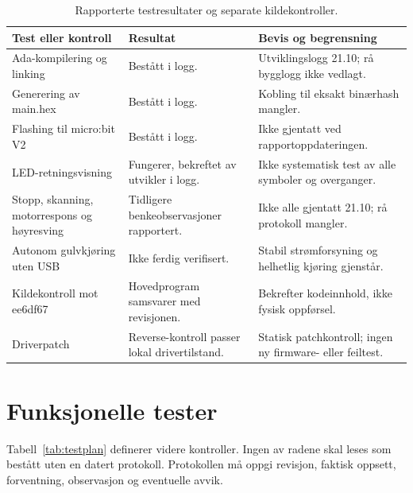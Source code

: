 \documentclass[a4paper,11pt,oneside]{report}
\begin{document}
\begin{table}[htbp]
\small
\begin{tabularx}{\textwidth}{@{}P{47mm}YP{39mm}@{}}
\toprule Test eller kontroll & Resultat & Bevis og begrensning\\\midrule
Ada-kompilering og linking & Bestått i logg. & Utviklingslogg 21.10; rå bygglogg ikke vedlagt.\\
Generering av main.hex & Bestått i logg. & Kobling til eksakt binærhash mangler.\\
Flashing til micro:bit V2 & Bestått i logg. & Ikke gjentatt ved rapportoppdateringen.\\
LED-retningsvisning & Fungerer, bekreftet av utvikler i logg. & Ikke systematisk test av alle symboler og overganger.\\
Stopp, skanning, motorrespons og høyresving & Tidligere benkeobservasjoner rapportert. & Ikke alle gjentatt 21.10; rå protokoll mangler.\\
Autonom gulvkjøring uten USB & Ikke ferdig verifisert. & Stabil strømforsyning og helhetlig kjøring gjenstår.\\
Kildekontroll mot ee6df67 & Hovedprogram samsvarer med revisjonen. & Bekrefter kodeinnhold, ikke fysisk oppførsel.\\
Driverpatch & Reverse-kontroll passer lokal drivertilstand. & Statisk patchkontroll; ingen ny firmware- eller feiltest.\\
\bottomrule
\end{tabularx}
\caption{Rapporterte testresultater og separate kildekontroller.}
\label{tab:resultater}
\end{table}

\section{Funksjonelle tester}
Tabell~\ref{tab:testplan} definerer videre kontroller. Ingen av radene
skal leses som bestått uten en datert protokoll. Protokollen må oppgi
revisjon, faktisk oppsett, forventning, observasjon og eventuelle avvik.
\end{document}
